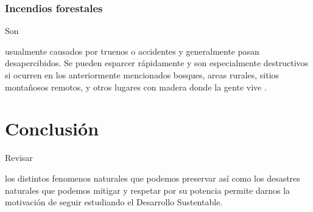 \documentclass[stu, 12pt, letterpaper, donotrepeattitle, floatsintext, natbib]{apa7}
\begin{document}
\subsubsection{Incendios forestales}
Son \begin{justifying}
    usualmente causados por truenos o accidentes y generalmente pasan desapercibidos. Se pueden esparcer rápidamente
    y son especialmente destructivos si ocurren en los anteriormente mencionados bosques, areas rurales,
    sitios montañosos remotos, y otros lugares con madera donde la gente vive \cite{unknown-author-no-dateD}.\par %
\end{justifying}
\vspace{\baselineskip}
\section*{Conclusión}
Revisar \begin{justifying}
    los distintos fenomenos naturales que podemos preservar así como los desastres naturales que podemos mitigar y respetar por su potencia
    permite darnos la motivación de seguir estudiando el Desarrollo Sustentable. \par 
\end{justifying}
\newpage
\setcounter{secnumdepth}{0} %
\renewcommand\refname{\textbf{Referencias}}
\end{document}
